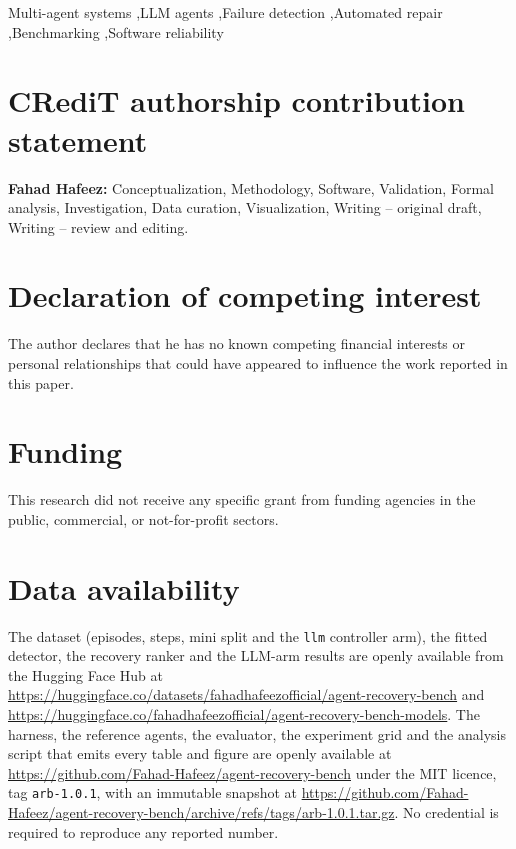 \documentclass[review,12pt]{elsarticle}
\begin{document}
\begin{frontmatter}
\begin{keyword}
Multi-agent systems \sep LLM agents \sep Failure detection \sep Automated repair
\sep Benchmarking \sep Software reliability
\end{keyword}

\end{frontmatter}

\linenumbers










\section*{CRediT authorship contribution statement}

\textbf{Fahad Hafeez:} Conceptualization, Methodology, Software, Validation, Formal analysis,
Investigation, Data curation, Visualization, Writing -- original draft, Writing -- review and
editing.

\section*{Declaration of competing interest}

The author declares that he has no known competing financial interests or personal relationships
that could have appeared to influence the work reported in this paper.

\section*{Funding}

This research did not receive any specific grant from funding agencies in the public, commercial,
or not-for-profit sectors.

\section*{Data availability}

The dataset (episodes, steps, mini split and the \texttt{llm} controller arm), the fitted detector,
the recovery ranker and the LLM-arm results are openly available from the Hugging Face Hub at
\url{https://huggingface.co/datasets/fahadhafeezofficial/agent-recovery-bench} and
\url{https://huggingface.co/fahadhafeezofficial/agent-recovery-bench-models}. The harness, the
reference agents, the evaluator, the experiment grid and the analysis script that emits every
table and figure are openly available at
\url{https://github.com/Fahad-Hafeez/agent-recovery-bench} under the MIT licence, tag
\texttt{arb-1.0.1}, with an immutable snapshot at
\url{https://github.com/Fahad-Hafeez/agent-recovery-bench/archive/refs/tags/arb-1.0.1.tar.gz}.
No credential is required to reproduce any reported number.



\end{document}
